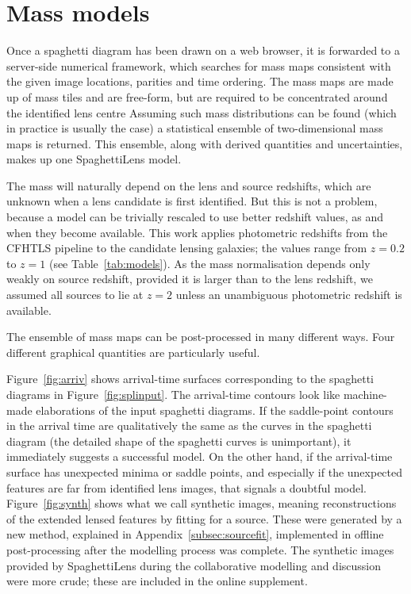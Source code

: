 \section{Mass models}\label{sec:massmodels}

Once a spaghetti diagram has been drawn on a web browser, it is
forwarded to a server-side numerical framework, which searches for
mass maps consistent with the given image locations, parities and time
ordering.  The mass maps are made up of mass tiles and are free-form,
but are required to be concentrated around the identified lens centre
\citep[see][for the precise formulation of the search
  problem.]{2014MNRAS.445.2181C} Assuming such mass distributions can
be found (which in practice is usually the case) a statistical
ensemble of two-dimensional mass maps is returned.  This ensemble,
along with derived quantities and uncertainties, makes up one
SpaghettiLens model.

The mass will naturally depend on the lens and source redshifts, which
are unknown when a lens candidate is first identified.  But this is
not a problem, because a model can be trivially rescaled to use better
redshift values, as and when they become available.  This work applies
photometric redshifts from the CFHTLS pipeline to the candidate
lensing galaxies; the values range from $z=0.2$ to $z=1$ (see
Table~\ref{tab:models}).  As the mass normalisation depends only weakly
on source redshift, provided it is larger than to the lens redshift,
we assumed all sources to lie at $z=2$ unless an unambiguous photometric
redshift is available.

The ensemble of mass maps can be post-processed in many different
ways.  Four different graphical quantities are particularly useful.

Figure~\ref{fig:arriv} shows arrival-time surfaces corresponding to
the spaghetti diagrams in Figure~\ref{fig:splinput}.  The arrival-time
contours look like machine-made elaborations of the input spaghetti
diagrams.  If the saddle-point contours in the arrival time are
qualitatively the same as the curves in the spaghetti diagram (the
detailed shape of the spaghetti curves is unimportant), it immediately
suggests a successful model.  On the other hand, if the arrival-time
surface has unexpected minima or saddle points, and especially if the
unexpected features are far from identified lens images, that signals
a doubtful model.  Figure~\ref{fig:synth} shows what we call synthetic
images, meaning reconstructions of the extended lensed features by
fitting for a source.  These were generated by a new method, explained
in Appendix~\ref{subsec:sourcefit}, implemented in offline
post-processing after the modelling process was complete.  The
synthetic images provided by SpaghettiLens during the collaborative
modelling and discussion were more crude; these are included in the
online supplement.

